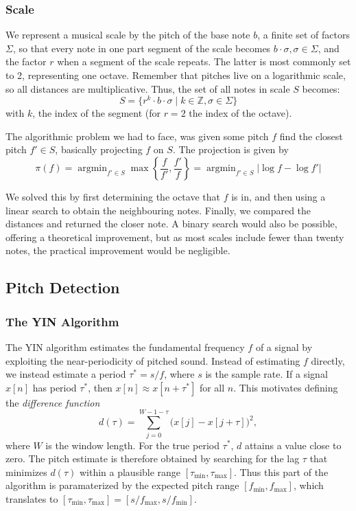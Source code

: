 \documentclass[sigconf]{acmart}
\DeclareMathOperator*{\argmin}{argmin}
\begin{document}
    \subsubsection{Scale}
    \label{sec:scale}
    We represent a musical scale by the pitch of the base note $b$, a finite set of factors $\Sigma$, so that every note in one part segment of the scale becomes $b \cdot \sigma, \sigma\in\Sigma$, and the factor $r$ when a segment of the scale repeats. The latter is most commonly set to 2, representing one octave. Remember that pitches live on a logarithmic scale, so all distances are multiplicative. Thus, the set of all notes in scale $S$ becomes:
    $$S = \{r^k \cdot b \cdot \sigma \mid k \in \mathbb{Z}, \sigma \in \Sigma\}$$
    with $k$, the index of the segment (for $r=2$ the index of the octave).

    The algorithmic problem we had to face, was given some pitch $f$ find the closest pitch $f' \in S$, basically projecting $f$ on $S$. The projection is given by
    $$\pi(f) = \argmin_{f'\in S} \max\left\{\frac{f}{f'}, \frac{f'}{f}\right\} = \argmin_{f'\in S}|\log f - \log f'|$$

    We solved this by first determining the octave that $f$ is in, and then using a linear search to obtain the neighbouring notes. Finally, we compared the distances and returned the closer note. A binary search would also be possible, offering a theoretical improvement, but as most scales include fewer than twenty notes, the practical improvement would be negligible.

    \subsection{Pitch Detection}
    \label{sec:pitch-detection}

    \subsubsection{The YIN Algorithm}
    The YIN algorithm \cite{de2002yin} estimates the fundamental frequency $f$ of a signal by exploiting the near-periodicity of pitched sound. Instead of estimating $f$ directly, we instead estimate a period $\tau^* = s/f$, where $s$ is the sample rate. If a signal $x[n]$ has period $\tau^*$, then $x[n] \approx x[n + \tau^*]$ for all $n$. This motivates defining the \emph{difference function}
    $$
    d(\tau) = \sum_{j=0}^{W-1-\tau} \bigl(x[j] - x[j+\tau]\bigr)^2,
    $$
    where $W$ is the window length. For the true period $\tau^*$, $d$ attains a value close to zero. The pitch estimate is therefore obtained by searching for the lag $\tau$ that minimizes $d(\tau)$ within a plausible range $[\tau_{\min}, \tau_{\max}]$. Thus this part of the algorithm is paramaterized by the expected pitch range $[f_{\min}, f_{\max}]$, which translates to $[\tau_{\min}, \tau_{\max}] = [s/f_{\max}, s/f_{\min}]$.
\end{document}
